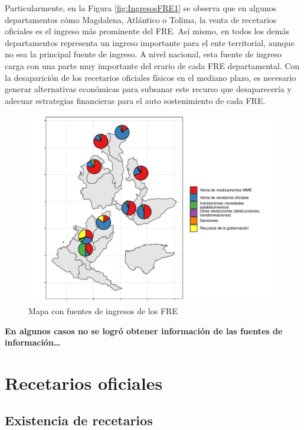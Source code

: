 \documentclass[
]{book}
\begin{document}
Particularmente, en la Figura \ref{fig:IngresosFRE1} se observa que en algunos departamentos cómo Magdalena, Atlántico o Tolima, la venta de recetarios oficiales es el ingreso más prominente del FRE. Así mismo, en todos los demás departamentos representa un ingreso importante para el ente territorial, aunque no sea la principal fuente de ingreso. A nivel nacional, esta fuente de ingreso carga con una parte muy importante del erario de cada FRE departamental. Con la desaparición de los recetarios oficiales físicos en el mediano plazo, es necesario generar alternativas económicas para subsanar este recurso que desaparecería y adecuar estrategias financieras para el auto sostenimiento de cada FRE.

\begin{figure}
\includegraphics[width=0.85\linewidth]{InformeFinal_files/figure-latex/IngresosFRE2-1} \caption{Mapa con fuentes de ingresos de los FRE}\label{fig:IngresosFRE2}
\end{figure}

\textbf{En algunos casos no se logró obtener información de las fuentes de información\ldots{}}

\hypertarget{recetarios-oficiales}{%
\chapter{Recetarios oficiales}\label{recetarios-oficiales}}


\hypertarget{existencia-de-recetarios}{%
\section{Existencia de recetarios}\label{existencia-de-recetarios}}
\end{document}
